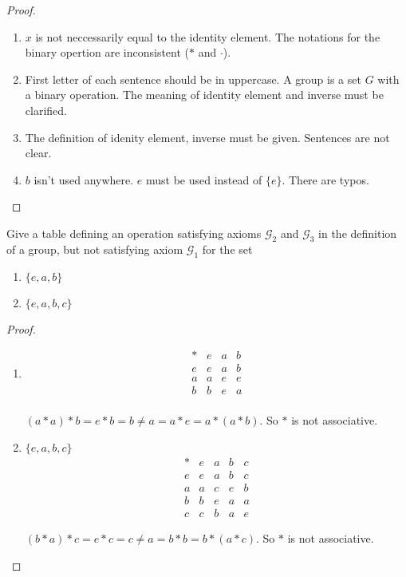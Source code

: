 \begin{proof}
    \begin{enumerate}
        \item $x$ is not neccessarily equal to the identity element. The notations for the binary opertion are inconsistent ($*$ and $\cdot$).
        \item First letter of each sentence should be in uppercase. A group is a set $G$ with a binary operation. The meaning of identity element and inverse must be clarified.
        \item The definition of idenity element, inverse must be given. Sentences are not clear.
        \item $b$ isn't used anywhere. $e$ must be used instead of $\{e\}$. There are typos.
    \end{enumerate}
\end{proof}

\begin{exercise}
    Give a table defining an operation satisfying axioms $\mathscr{G}_{2}$ and $\mathscr{G}_{3}$ in the definition of a group, but not satisfying axiom $\mathscr{G}_{1}$ for the set
    \begin{enumerate}[label={\textbf{\alph*.}}]
        \item $\{ e, a, b \}$
        \item $\{ e, a, b, c \}$
    \end{enumerate}
\end{exercise}

\begin{proof}
    \begin{enumerate}[label={\textbf{\alph*.}}]
        \item
              \[
                  \begin{array}{c|ccc}
                      * & e & a & b \\
                      \hline
                      e & e & a & b \\
                      a & a & e & e \\
                      b & b & e & a \\
                  \end{array}
              \]

              $(a * a) * b = e * b = b \ne a = a * e = a * (a * b)$. So $*$ is not associative.
        \item $\{ e, a, b, c \}$
              \[
                  \begin{array}{c|cccc}
                      * & e & a & b & c \\
                      \hline
                      e & e & a & b & c \\
                      a & a & c & e & b \\
                      b & b & e & a & a \\
                      c & c & b & a & e
                  \end{array}
              \]

              $(b * a) * c = e * c = c \ne a = b * b = b * (a * c)$. So $*$ is not associative.
    \end{enumerate}
\end{proof}

